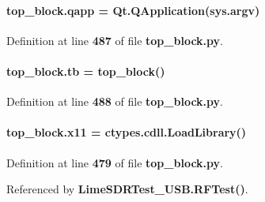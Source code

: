 \paragraph[{qapp}]{\setlength{\rightskip}{0pt plus 5cm}top\+\_\+block.\+qapp = Qt.\+Q\+Application(sys.\+argv)}\label{namespacetop__block_a829451c0d0eed6800eeff035ba442285}


Definition at line {\bf 487} of file {\bf top\+\_\+block.\+py}.

\paragraph[{tb}]{\setlength{\rightskip}{0pt plus 5cm}top\+\_\+block.\+tb = {\bf top\+\_\+block}()}\label{namespacetop__block_a950cb61965ebf1f763eb7360383ab5dc}


Definition at line {\bf 488} of file {\bf top\+\_\+block.\+py}.

\paragraph[{x11}]{\setlength{\rightskip}{0pt plus 5cm}top\+\_\+block.\+x11 = ctypes.\+cdll.\+Load\+Library(\textquotesingle{})}\label{namespacetop__block_a9830cd1f0e2f6c24be6d237e1ef40a19}


Definition at line {\bf 479} of file {\bf top\+\_\+block.\+py}.



Referenced by {\bf Lime\+S\+D\+R\+Test\+\_\+\+U\+S\+B.\+R\+F\+Test()}.

